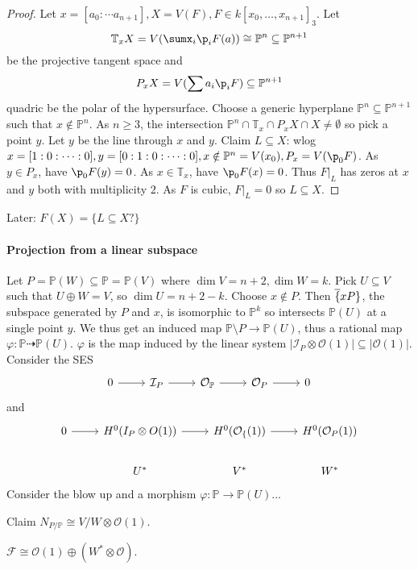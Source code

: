 \documentclass[a4paper]{article}
\renewcommand*{\P}{\mathbb{P}}
\newcommand{\sh}[1]{\mathcal{#1}} %
\newcommand{\rational}{\dashrightarrow} %
\begin{document}
\begin{proof}
  Let \(x = [a_0: \cdots a_{n + 1}], X = V(F), F \in k[x_0, \dots, x_{n + 1}]_3\). Let
  \[
    \mathbb T_xX = V(\sumx_i \p_i F(a)) \cong \P^n \subseteq \P^{n + 1}
  \]
  be the projective tangent space and
  \[
    P_xX = V(\sum a_i \p_i F) \subseteq \P^{n + 1}
  \]
  quadric be the polar of the hypersurface. Choose a generic hyperplane \(\P^n \subseteq \P^{n + 1}\) such that \(x \notin \P^n\). As \(n \geq 3\), the intersection \(\P^n \cap \mathbb T_x \cap P_xX \cap X \ne \emptyset\) so pick a point \(y\). Let \(y\) be the line through \(x\) and \(y\). Claim \(L \subseteq X\): wlog \(x = [1:0: \cdots :0], y = [0:1: 0: \cdots:0], x \notin \P^n = V(x_0), P_x = V(\p_0F)\). As \(y \in P_x\), have \(\p_0F(y) = 0\). As \(x \in \mathbb T_x\), have \(\p_0F(x) = 0\). Thus \(F|_L\) has zeros at \(x\) and \(y\) both with multiplicity \(2\). As \(F\) is cubic, \(F|_L = 0\) so \(L \subseteq X\).
\end{proof}

Later: \(F(X) = \{L \subseteq X ?\}\)

\paragraph{Projection from a linear subspace}

Let \(P = \P(W) \subseteq \P = \P(V)\) where \(\dim V = n + 2, \dim W = k\). Pick \(U \subseteq V\) such that \(U \oplus W = V\), so \(\dim U = n + 2 - k\). Choose \(x \notin P\). Then \(\overline \{xP\}\), the subspace generated by \(P\) and \(x\), is isomorphic to \(\P^k\) so intersects \(\P(U)\) at a single point \(y\). We thus get an induced map \(\P \setminus P \to \P(U)\), thus a rational map \(\varphi: \P \rational \P(U)\). \(\varphi\) is the map induced by the linear system \(|\sh I_P \otimes \sh O(1)| \subseteq |\sh O(1)|\). Consider the SES
\[
  \begin{tikzcd}
    0 \ar[r] & \sh I_P \ar[r] & \sh O_\P \ar[r] & \sh O_P \ar[r] & 0
  \end{tikzcd}
\]
and
\[
  \begin{tikzcd}
    0 \ar[r] & H^0(I_P \otimes O(1)) \ar[r] & H^0(\sh O_\{(1)) \ar[r] & H^0(\sh O_P(1)) \\
    & U^* & V^* & W^*
  \end{tikzcd}
\]
Consider the blow up and a morphism \(\varphi: \P \to \P(U)\)...

Claim \(N_{P/\P} \cong V/W \otimes \sh O(1)\).

\begin{ex}
  \(\sh F \cong \sh O(1) \oplus (W^* \otimes \sh O)\).
\end{ex}
\end{document}
